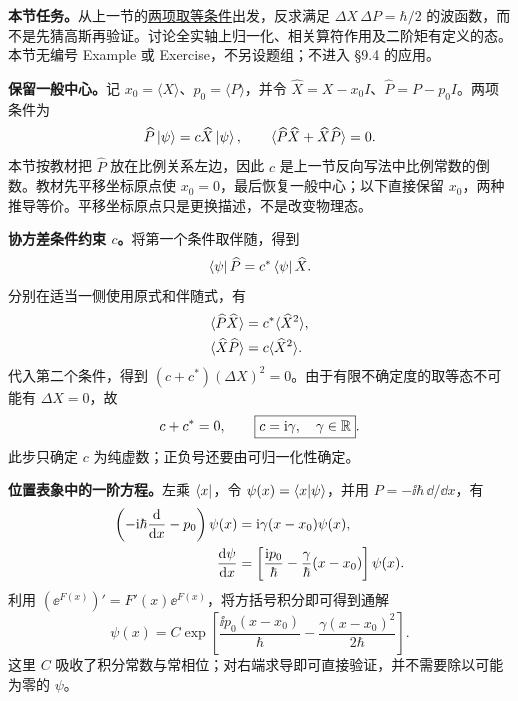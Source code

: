 \textbf{本节任务。}从上一节的\hyperref[topic:QM-C09-S02-T03]{两项取等条件}出发，反求满足 $\Delta X\,\Delta P=\hbar/2$ 的波函数，而不是先猜高斯再验证。讨论全实轴上归一化、相关算符作用及二阶矩有定义的态。本节无编号 Example 或 Exercise，不另设题组；不进入 \S 9.4 的应用。

\textbf{保留一般中心。}记 $x_0=\langle X\rangle$、$p_0=\langle P\rangle$，并令 $\widehat X=X-x_0I$、$\widehat P=P-p_0I$。两项条件为
\begin{equation}
  \widehat P\left|\psi\right\rangle=c\widehat X\left|\psi\right\rangle,\qquad
  \langle\widehat P\widehat X+\widehat X\widehat P\rangle=0.
  \label{eq:QM-C09-S03-equality}
\end{equation}
本节按教材把 $\widehat P$ 放在比例关系左边，因此 $c$ 是上一节反向写法中比例常数的倒数。教材先平移坐标原点使 $x_0=0$，最后恢复一般中心；以下直接保留 $x_0$，两种推导等价。平移坐标原点只是更换描述，不是改变物理态。

\textbf{协方差条件约束 $c$。}将第一个条件取伴随，得到
\begin{equation}
  \left\langle \psi\right|\widehat P=c^*\left\langle \psi\right|\widehat X.
\end{equation}
分别在适当一侧使用原式和伴随式，有
\begin{align}
  \langle\widehat P\widehat X\rangle&=c^*\langle\widehat X^2\rangle,\notag\\
  \langle\widehat X\widehat P\rangle&=c\langle\widehat X^2\rangle.
\end{align}
代入第二个条件，得到 $(c+c^*)(\Delta X)^2=0$。由于有限不确定度的取等态不可能有 $\Delta X=0$，故
\begin{equation}
  c+c^*=0,\qquad \boxed{c=\mathrm{i}\gamma,\quad\gamma\in\mathbb{R}}.
\end{equation}
此步只确定 $c$ 为纯虚数；正负号还要由可归一化性确定。

\textbf{位置表象中的一阶方程。}左乘 $\left\langle x\right|$，令 $\psi(x)=\left\langle x \middle| \psi \right\rangle$，并用 $P=-\ii\hbar\,\dd/\dd x$，有
\begin{align}
  \left(-\mathrm{i}\hbar\frac{\mathop{}\!\mathrm{d}}{\mathop{}\!\mathrm{d} x}-p_0\right)\psi(x)
    &=\mathrm{i}\gamma(x-x_0)\psi(x),\notag\\
  \frac{\mathop{}\!\mathrm{d}\psi}{\mathop{}\!\mathrm{d} x}
    &=\left[\frac{\mathrm{i} p_0}{\hbar}-\frac{\gamma}{\hbar}(x-x_0)\right]\psi(x).
  \label{eq:QM-C09-S03-ode}
\end{align}
利用 $(\ee^{F(x)})'=F'(x)\ee^{F(x)}$，将方括号积分即可得到通解
\begin{equation}
  \boxed{\psi(x)=C\exp\!\left[
    \frac{\ii p_0(x-x_0)}{\hbar}
    -\frac{\gamma(x-x_0)^2}{2\hbar}\right]}.
  \label{eq:QM-C09-S03-gaussian-gamma}
\end{equation}
这里 $C$ 吸收了积分常数与常相位；对右端求导即可直接验证，并不需要除以可能为零的 $\psi$。

